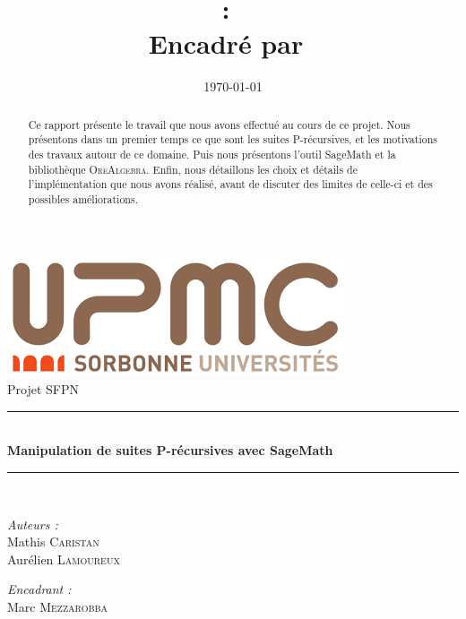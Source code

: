 \documentclass[12pt]{article}
\title{
\vspace{1in}
\textmd{\textbf{\hmwkClass:\ \hmwkTitle}}\\
\vspace{0.1in}\large{Encadré par\ \hmwkClassInstructor}
}
\author{\textbf{\hmwkAuthorName}}
\date{\today}
\begin{document}
\begin{titlepage}
    \begin{center}
        \includegraphics[scale=0.7]{figures/upmc}\\[1cm]

        {\large Projet SFPN}\\[0.5cm]
        \rule{\linewidth}{0.5mm} \\[0.4cm]
        { \huge \bfseries Manipulation de suites P-récursives avec SageMath \\[0.4cm] }
        \rule{\linewidth}{0.5mm} \\[1.5cm]

        \noindent
        \begin{minipage}{0.4\textwidth}
            \begin{flushleft} \large
                \emph{Auteurs :}\\
                    Mathis \textsc{Caristan}\\
                    Aurélien \textsc{Lamoureux}\\
            \end{flushleft}
        \end{minipage}
        \begin{minipage}{0.4\textwidth}
            \begin{flushright} \large
                \emph{Encadrant :} \\
                    Marc \textsc{Mezzarobba}\\
            \end{flushright}
        \end{minipage}
        \vspace{1in}
        \begin{abstract}
            Ce rapport présente le travail que nous avons effectué au cours de ce projet.
            Nous présentons dans un premier temps ce que sont les suites P-récursives, et les
            motivations des travaux autour de ce domaine.
            Puis nous présentons l'outil SageMath et la bibliothèque \textsc{OreAlgebra}.
            Enfin, nous détaillons les choix et détails de l'implémentation que nous avons réalisé,
            avant de discuter des limites de celle-ci et des possibles améliorations.
        \end{abstract}
   \end{center}
\end{titlepage}
\end{document}
